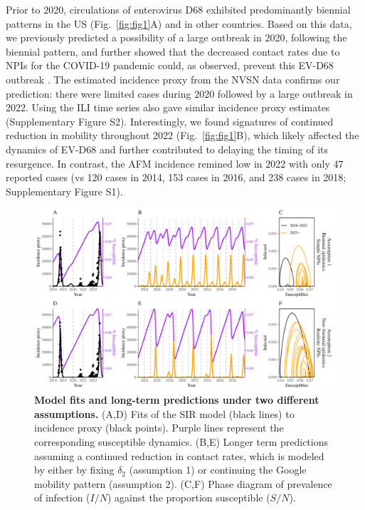 \documentclass[12pt]{article}
\newcommand{\fref}[1]{Fig.~\ref{fig:#1}}
\begin{document}
Prior to 2020, circulations of enterovirus D68 exhibited predominantly biennial patterns in the US (\fref{fig1}A) and in other countries.
Based on this data, we previously predicted a possibility of a large outbreak in 2020, following the biennial pattern, and further showed that the decreased contact rates due to NPIs for the COVID-19 pandemic could, as observed, prevent this EV-D68 outbreak \citep{park2021epidemiological}.
The estimated incidence proxy from the NVSN data \citep{ma2022increase} confirms our prediction: there were limited cases during 2020 followed by a large outbreak in 2022.
Using the ILI time series also gave similar incidence proxy estimates (Supplementary Figure S2).
Interestingly, we found signatures of continued reduction in mobility throughout 2022 (\fref{fig1}B), which likely affected the dynamics of EV-D68 and further contributed to delaying the timing of its resurgence.
In contrast, the AFM incidence remined low in 2022 with only 47 reported cases (vs 120 cases in 2014, 153 cases in 2016, and 238 cases in 2018; Supplementary Figure S1).

\begin{figure}[!th]
\includegraphics[width=\textwidth]{../figure_pub/figure2.pdf}
\caption{
\textbf{Model fits and long-term predictions under two different assumptions.}
(A,D) Fits of the SIR model (black lines) to incidence proxy (black points).
Purple lines represent the corresponding susceptible dynamics.
(B,E) Longer term predictions assuming a continued reduction in contact rates, which is modeled by either by fixing $\delta_2$ (assumption 1) or continuing the Google mobility pattern (assumption 2).
(C,F) Phase diagram of prevalence of infection ($I/N$) against the proportion susceptible ($S/N$).
}
\label{fig:fig2}
\end{figure}
\end{document}
